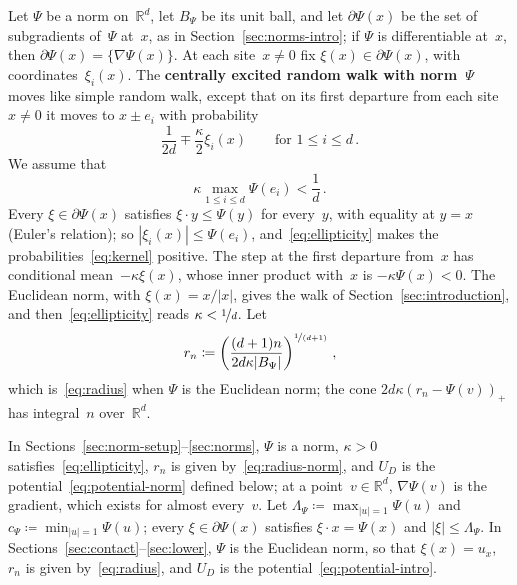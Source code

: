 \documentclass[11pt]{amsart}
\theoremstyle{plain}
\theoremstyle{definition}
\newcommand{\R}{\mathbb R}
\newcommand{\drift}{\kappa}
\newcommand{\gauge}{\Psi}
\newcommand{\defn}[1]{\textbf{#1}}
\newcommand{\nf}{\nicefrac}
\numberwithin{equation}{section}
\begin{document}
Let $\gauge$ be a norm on~$\R^d$, let $B_\gauge$ be its unit ball, and let $\partial\gauge(x)$ be the set of subgradients of~$\gauge$ at~$x$, as in Section~\ref{sec:norms-intro}; if $\gauge$ is differentiable at~$x$, then $\partial\gauge(x)=\{\nabla\gauge(x)\}$. At each site~$x\neq0$ fix $\xi(x)\in\partial\gauge(x)$, with coordinates~$\xi_i(x)$. The \defn{centrally excited random walk with norm~$\gauge$} moves like simple random walk, except that on its first departure from each site~$x\neq0$ it moves to $x\pm e_i$ with probability
\begin{equation}\label{eq:kernel}
\frac1{2d}\mp\frac\drift2\xi_i(x)
\qquad\text{for } 1\leq i\leq d\, .
\end{equation}
We assume that
\begin{equation}\label{eq:ellipticity}
\drift\max_{1\leq i\leq d}\gauge(e_i)<\frac1d\, .
\end{equation}
Every $\xi\in\partial\gauge(x)$ satisfies $\xi\cdot y\leq\gauge(y)$ for every~$y$, with equality at $y=x$ (Euler's relation); so $|\xi_i(x)|\leq\gauge(e_i)$, and~\eqref{eq:ellipticity} makes the probabilities~\eqref{eq:kernel} positive. The step at the first departure from~$x$ has conditional mean~$-\drift\xi(x)$, whose inner product with~$x$ is $-\drift\gauge(x)<0$. The Euclidean norm, with $\xi(x)=x/|x|$, gives the walk of Section~\ref{sec:introduction}, and then~\eqref{eq:ellipticity} reads $\drift<\nf1d$. Let
\begin{equation}\label{eq:radius-norm}
r_n\coloneqq\left(\frac{(d+1)n}{2d\drift|B_\gauge|}\right)^{\nf{1}{(d+1)}}\, ,
\end{equation}
which is~\eqref{eq:radius} when $\gauge$ is the Euclidean norm; the cone $2d\drift(r_n-\gauge(v))_+$ has integral~$n$ over~$\R^d$.

In Sections~\ref{sec:norm-setup}--\ref{sec:norms}, $\gauge$ is a norm, $\drift>0$ satisfies~\eqref{eq:ellipticity}, $r_n$ is given by~\eqref{eq:radius-norm}, and $U_D$ is the potential~\eqref{eq:potential-norm} defined below; at a point~$v\in\R^d$, $\nabla\gauge(v)$ is the gradient, which exists for almost every~$v$. Let $\Lambda_\gauge\coloneqq\max_{|u|=1}\gauge(u)$ and $c_\gauge\coloneqq\min_{|u|=1}\gauge(u)$; every $\xi\in\partial\gauge(x)$ satisfies $\xi\cdot x=\gauge(x)$ and $|\xi|\leq\Lambda_\gauge$. In Sections~\ref{sec:contact}--\ref{sec:lower}, $\gauge$ is the Euclidean norm, so that $\xi(x)=u_x$, $r_n$ is given by~\eqref{eq:radius}, and $U_D$ is the potential~\eqref{eq:potential-intro}.
\end{document}
